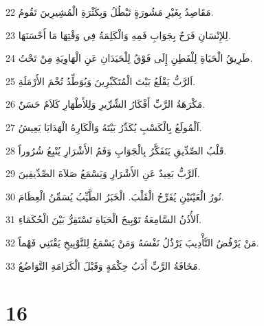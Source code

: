 \par 22 مَقَاصِدُ بِغَيْرِ مَشُورَةٍ تَبْطُلُ وَبِكَثْرَةِ الْمُشِيرِينَ تَقُومُ.
\par 23 لِلإِنْسَانِ فَرَحٌ بِجَوَابِ فَمِهِ وَالْكَلِمَةُ فِي وَقْتِهَا مَا أَحْسَنَهَا.
\par 24 طَرِيقُ الْحَيَاةِ لِلْفَطِنِ إِلَى فَوْقُ لِلْحَيَدَانِ عَنِ الْهَاوِيَةِ مِنْ تَحْتُ.
\par 25 اَلرَّبُّ يَقْلَعُ بَيْتَ الْمُتَكَبِّرِينَ وَيُوَطِّدُ تُخْمَ الأَرْمَلَةِ.
\par 26 مَكْرَهَةُ الرَّبِّ أَفْكَارُ الشِّرِّيرِ وَلِلأَطْهَارِ كَلاَمٌ حَسَنٌ.
\par 27 اَلْمُولَعُ بِالْكَسْبِ يُكَدِّرُ بَيْتَهُ وَالْكَارِهُ الْهَدَايَا يَعِيشُ.
\par 28 قَلْبُ الصِّدِّيقِ يَتَفَكَّرُ بِالْجَوَابِ وَفَمُ الأَشْرَارِ يُنْبِعُ شُرُوراً.
\par 29 اَلرَّبُّ بَعِيدٌ عَنِ الأَشْرَارِ وَيَسْمَعُ صَلاَةَ الصِّدِّيقِينَ.
\par 30 نُورُ الْعَيْنَيْنِ يُفَرِّحُ الْقَلْبَ. الْخَبَرُ الطَّيِّبُ يُسَمِّنُ الْعِظَامَ.
\par 31 اَلأُذُنُ السَّامِعَةُ تَوْبِيخَ الْحَيَاةِ تَسْتَقِرُّ بَيْنَ الْحُكَمَاءِ.
\par 32 مَنْ يَرْفُضُ التَّأْدِيبَ يَرْذُلُ نَفْسَهُ وَمَنْ يَسْمَعُ لِلتَّوْبِيخِ يَقْتَنِي فَهْماً.
\par 33 مَخَافَةُ الرَّبِّ أَدَبُ حِكْمَةٍ وَقَبْلَ الْكَرَامَةِ التَّوَاضُعُ.

\chapter{16}

